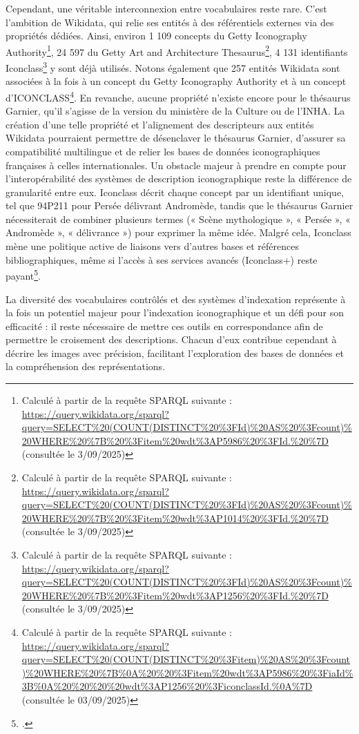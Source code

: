 Cependant, une véritable interconnexion entre vocabulaires reste rare. C’est l’ambition de Wikidata, qui relie ses entités à des référentiels externes via des propriétés dédiées. Ainsi, environ 1 109 concepts du Getty Iconography Authority\footnote{Calculé à partir de la requête SPARQL suivante : \url{https://query.wikidata.org/sparql?query=SELECT\%20(COUNT(DISTINCT\%20\%3FId)\%20AS\%20\%3Fcount)\%20WHERE\%20\%7B\%20\%3Fitem\%20wdt\%3AP5986\%20\%3FId.\%20\%7D} (consultée le 3/09/2025)}, 24 597 du Getty Art and Architecture Thesaurus\footnote{Calculé à partir de la requête SPARQL suivante : \url{https://query.wikidata.org/sparql?query=SELECT\%20(COUNT(DISTINCT\%20\%3FId)\%20AS\%20\%3Fcount)\%20WHERE\%20\%7B\%20\%3Fitem\%20wdt\%3AP1014\%20\%3FId.\%20\%7D} (consultée le 3/09/2025)},  4 131 identifiants Iconclass\footnote{Calculé à partir de la requête SPARQL suivante : \url{https://query.wikidata.org/sparql?query=SELECT\%20(COUNT(DISTINCT\%20\%3FId)\%20AS\%20\%3Fcount)\%20WHERE\%20\%7B\%20\%3Fitem\%20wdt\%3AP1256\%20\%3FId.\%20\%7D} (consultée le 3/09/2025)} y sont déjà utilisés. Notons également que 257 entités Wikidata sont associées à la fois à un concept du Getty Iconography Authority et à un concept d’ICONCLASS\footnote{Calculé à partir de la requête SPARQL suivante : \url{https://query.wikidata.org/sparql?query=SELECT\%20(COUNT(DISTINCT\%20\%3Fitem)\%20AS\%20\%3Fcount)\%20WHERE\%20\%7B\%0A\%20\%20\%3Fitem\%20wdt\%3AP5986\%20\%3FiaId\%3B\%0A\%20\%20\%20\%20wdt\%3AP1256\%20\%3FiconclassId.\%0A\%7D} (consultée le 03/09/2025)}. En revanche, aucune propriété n’existe encore pour le thésaurus Garnier, qu’il s’agisse de la version du ministère de la Culture ou de l’INHA. La création d’une telle propriété et l’alignement des descripteurs aux entités Wikidata pourraient permettre de désenclaver le thésaurus Garnier, d’assurer sa compatibilité multilingue et de relier les bases de données iconographiques françaises à celles internationales.
Un obstacle majeur à prendre en compte pour l'interopérabilité des systèmes de description iconographique reste la différence de granularité entre eux. Iconclass décrit chaque concept par un identifiant unique, tel que 94P211 pour Persée délivrant Andromède, tandis que le thésaurus Garnier nécessiterait de combiner plusieurs termes (« Scène mythologique », « Persée », « Andromède », « délivrance ») pour exprimer la même idée. Malgré cela, Iconclass mène une politique active de liaisons vers d’autres bases et références bibliographiques, même si l’accès à ses services avancés (Iconclass+) reste payant\footcite{brandhorstVirtualLibraryIconographic2023}.

La diversité des vocabulaires contrôlés et des systèmes d’indexation représente à la fois un potentiel majeur pour l’indexation iconographique et un défi pour son efficacité : il reste nécessaire de mettre ces outils en correspondance afin de permettre le croisement des descriptions. Chacun d’eux contribue cependant à décrire les images avec précision, facilitant l’exploration des bases de données et la compréhension des représentations.
